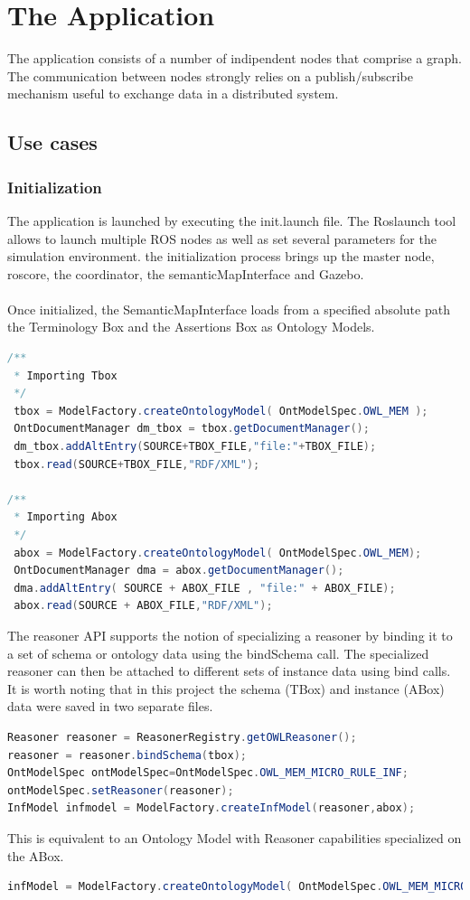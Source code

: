 \section{The Application}

The application consists of a number of indipendent nodes that comprise a graph. The communication between nodes strongly relies on a publish/subscribe mechanism useful to  exchange data in a distributed system. 

\subsection{Use cases}

\subsubsection{Initialization}
The application is launched by executing the init.launch file. The Roslaunch tool allows to launch multiple ROS nodes as well as set several parameters for the simulation environment. the initialization process brings up the master node, roscore, the coordinator, the semanticMapInterface and Gazebo.\\
\\
Once initialized, the SemanticMapInterface loads from a specified absolute path the Terminology Box and the Assertions Box as Ontology Models.

\begin{lstlisting}[language=Java]
/**
 * Importing Tbox
 */
 tbox = ModelFactory.createOntologyModel( OntModelSpec.OWL_MEM );
 OntDocumentManager dm_tbox = tbox.getDocumentManager();
 dm_tbox.addAltEntry(SOURCE+TBOX_FILE,"file:"+TBOX_FILE);
 tbox.read(SOURCE+TBOX_FILE,"RDF/XML");

/**
 * Importing Abox
 */
 abox = ModelFactory.createOntologyModel( OntModelSpec.OWL_MEM);
 OntDocumentManager dma = abox.getDocumentManager();
 dma.addAltEntry( SOURCE + ABOX_FILE , "file:" + ABOX_FILE);
 abox.read(SOURCE + ABOX_FILE,"RDF/XML");
\end{lstlisting}

The reasoner API supports the notion of specializing a reasoner by binding it to a set of schema or ontology data using the bindSchema call. The specialized reasoner can then be attached to different sets of instance data using bind calls. It is worth noting that in this project the schema (TBox) and instance (ABox) data were saved in two separate files.

\begin{lstlisting}[language=Java]
Reasoner reasoner = ReasonerRegistry.getOWLReasoner();
reasoner = reasoner.bindSchema(tbox);
OntModelSpec ontModelSpec=OntModelSpec.OWL_MEM_MICRO_RULE_INF;
ontModelSpec.setReasoner(reasoner);
InfModel infmodel = ModelFactory.createInfModel(reasoner,abox);
\end{lstlisting}
This is equivalent to an Ontology Model with Reasoner capabilities
specialized on the ABox.
\begin{lstlisting}[language=Java]
infModel = ModelFactory.createOntologyModel( OntModelSpec.OWL_MEM_MICRO_RULE_INF, abox);
\end{lstlisting}

